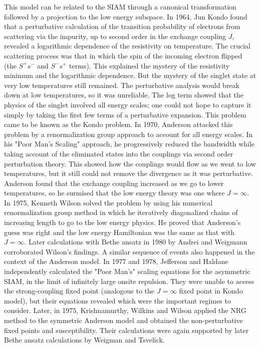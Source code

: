 \documentclass[12pt,twoside]{article}
\numberwithin{equation}{section}
\begin{document}
This model can be related to the SIAM through a canonical transformation followed by a projection to the low energy subspace.
In 1964, Jun Kondo\cite{Kondo} found that a perturbative calculation of the transition probability of electrons from scattering via the impurity, up to second order in the exchange coupling \(J\), revealed a logarithmic dependence of the resistivity on temperature.
The crucial scattering process was that in which the spin of the incoming electron flipped (the \(S^+ s^-\) and \(S^- s^+\) terms).
This explained the mystery of the resistivity minimum and the logarithmic dependence.
But the mystery of the singlet state at very low temperatures still remained.
The perturbative analysis would break down at low temperatures, so it was unreliable.
The log term showed that the physics of the singlet involved all energy scales; one could not hope to capture it simply by taking the first few terms of a perturbative expansion.
This problem came to be known as the Kondo problem.
\pb In 1970, Anderson attacked this problem by a renormalization group approach to account for all energy scales.
In his "Poor Man's Scaling" approach, he progressively reduced the bandwidth while taking account of the eliminated states into the couplings via second order perturbation theory.
This showed how the couplings would flow as we went to low temperatures, but it still could not remove the divergence as it was perturbative.
Anderson found that the exchange coupling increased as we go to lower temperatures, so he surmised that the low energy theory was one where \(J=\infty\).
In 1975, Kenneth Wilson solved the problem by using his numerical renormalization group method in which he iteratively diagonalized chains of increasing length to go to the low energy physics.
He proved that Anderson's guess was right and the low energy Hamiltonian was the same as that with \(J=\infty\).
Later calculations with Bethe ansatz in 1980 by Andrei and Weigmann \cite{Andrei,wiegmann} corroborated Wilson's findings.
\pb A similar sequence of events also happened in the context of the Anderson model. In 1977 and 1978, Jefferson and Haldane independently calculated the "Poor Man's" scaling equations for the asymmetric SIAM, in the limit of infinitely large onsite repulsion. They were unable to access the strong-coupling fixed point (analogous to the \(J=\infty\) fixed point in Kondo model), but their equations revealed which were the important regimes to consider. Later, in 1975, Krishnamurthy, Wilkins and Wilson applied the NRG method to the symmetric Anderson model and obtained the non-perturbative fixed points and susceptibility. Their calculations were again supported by later Bethe ansatz calculations by Weigman and Tsvelick\cite{Tsvelick}.
\end{document}
